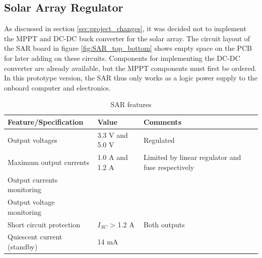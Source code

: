 \subsection{Solar Array Regulator}
%
%
As discussed in section \ref{sec:project_changes}, it was decided not to implement the \ac{MPPT} and DC-DC buck converter for the solar array. The circuit layout of the \ac{SAR} board in  figure \ref{fig:SAR_top_bottom} shows empty space on the \ac{PCB} for later adding on these circuits. Components for implementing the DC-DC converter are already available, but the \ac{MPPT} components must first be ordered.
%
%
In this prototype version, the \ac{SAR} thus only works as a logic power supply to the onboard computer and electronics.
%
%
\begin{table}[H]
\centering
\caption{\acl{SAR} features}
\label{tab:BCR_features}
\begin{tabular}{p{}p{}p{}}
\hline
\textbf{Feature/Specification} & \textbf{Value} & \textbf{Comments}\\
\hline
Output voltages & 3.3 V and 5.0 V & Regulated \\
Maximum output currents & 1.0 A and 1.2 A & Limited by linear regulator and fuse respectively \\
Output currents monitoring & & \\
Output voltage monitoring & & \\
Short circuit protection & $I_{SC}$ > 1.2 A & Both outputs \\
Quiescent current (standby) & 14 mA & \\
\hline
\end{tabular}
\end{table} 
%
%
